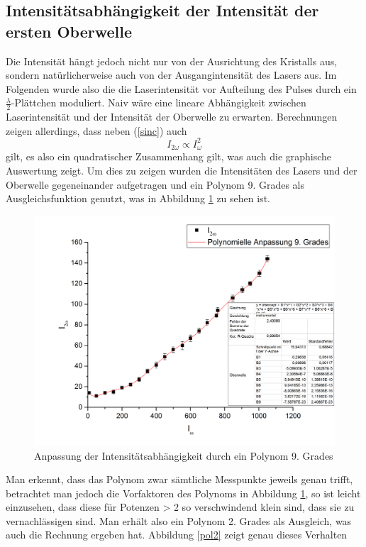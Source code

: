 \subsection{Intensitätsabhängigkeit der Intensität der ersten Oberwelle}
Die Intensität hängt jedoch nicht nur von der Ausrichtung des Kristalls aus, sondern natürlicherweise auch von der Ausgangintensität des Lasers aus. Im Folgenden wurde also die die Laserintensität vor Aufteilung des Pulses durch ein $\frac{\lambda}{2}$-Plättchen moduliert. \newline
Naiv wäre eine lineare Abhängigkeit zwischen Laserintensität und der Intensität der Oberwelle zu erwarten. Berechnungen zeigen allerdings, dass neben (\ref{sinc}) auch
\begin{equation}
I_{2\omega}\propto I_\omega^2
\end{equation}
gilt, es also ein quadratischer Zusammenhang gilt, was auch die graphische Auswertung zeigt. Um dies zu zeigen wurden die Intensitäten des Lasers und der Oberwelle gegeneinander aufgetragen und ein Polynom 9. Grades als Ausgleichsfunktion genutzt, was in Abbildung \ref{pol9} zu sehen ist.
\begin{figure}[H]
	\begin{center}
		\includegraphics[scale=.5]{Bilder/IntPol9.png}
		\caption{Anpassung der Intensitätsabhängigkeit durch ein Polynom 9. Grades}
		\label{pol9}
	\end{center}
\end{figure}
Man erkennt, dass das Polynom zwar sämtliche Messpunkte jeweils genau trifft, betrachtet man jedoch die Vorfaktoren des Polynoms in Abbildung \ref{pol9}, so ist leicht einzusehen, dass diese für Potenzen > 2 so verschwindend klein sind, dass sie zu vernachlässigen sind. Man erhält also ein Polynom 2. Grades als Ausgleich, was auch die Rechnung ergeben hat. Abbildung \ref{pol2} zeigt genau dieses Verhalten
